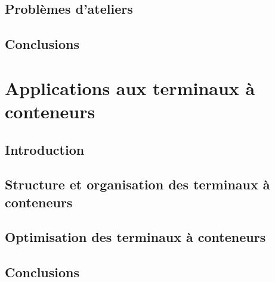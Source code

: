 \documentclass[
a4paper,
11pt,
twoside,
onecolumn,
openright,      %
leqno,          %
final   %
]{phdlasl}
\begin{document}
	\section{Problèmes d'ateliers}\label{part:art-JSSP}
	

	\section*{Conclusions}\label{partie:art-conclusions}
	

	\chapter{Applications aux terminaux à conteneurs}\label{chapitre:application}

	\section*{Introduction}\label{partie:application-introduction}
        

	\section{Structure et organisation des terminaux à conteneurs}\label{partie:application-terminaux}
		

	\section{Optimisation des terminaux à conteneurs}\label{partie:application-optimisationTerminaux}
	

	\section*{Conclusions}\label{partie:application-conclusions}
	

\end{document}
